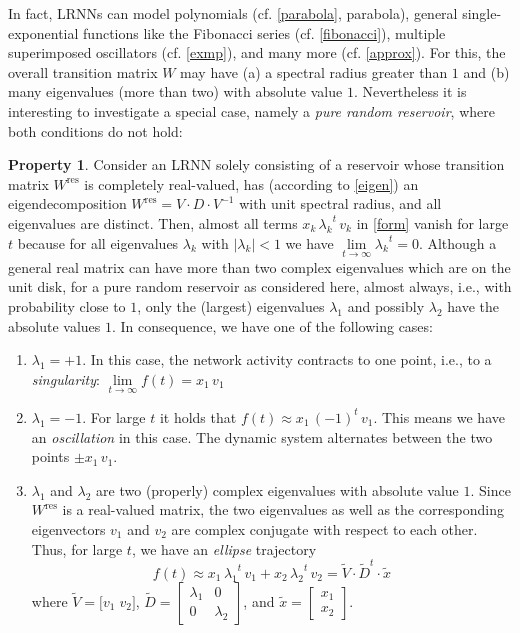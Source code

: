 \documentclass[twoside,11pt]{article}
\theoremstyle{definition}
\newtheorem{prop}{Property}
\begin{document}
In fact, LRNNs can model polynomials (cf. \cref{parabola}, parabola), general
single-exponential functions like the Fibonacci series (cf. \cref{fibonacci}),
multiple superimposed oscillators (cf. \cref{exmp}), and many more (cf.
\cref{approx}). For this, the overall transition matrix $W$ may have (a) a
spectral radius greater than $1$ and (b) many eigenvalues (more than two) with
absolute value $1$. Nevertheless it is interesting to investigate a special
case, namely a \emph{pure random reservoir}, where both conditions do not hold:

\begin{prop}\label{infty}
Consider an LRNN solely consisting of a reservoir whose transition matrix
$W^\mathrm{res}$ is completely real-valued, has (according to \cref{eigen}) an
eigendecomposition $W^\mathrm{res} = V \cdot D \cdot V^{-1}$ with unit spectral
radius, and all eigenvalues are distinct. Then, almost all terms
$x_k\,{\lambda_k}^t\,v_k$ in \cref{form} vanish for large $t$ because for all
eigenvalues $\lambda_k$ with $|\lambda_k| < 1$ we have $\lim\limits_{t \to
\infty} {\lambda_k}^t = 0$. Although a general real matrix can have more than
two complex eigenvalues which are on the unit disk, for a pure random reservoir
as considered here, almost always, i.e., with probability close to $1$, only the
(largest) eigenvalues $\lambda_1$ and possibly $\lambda_2$ have the absolute
values $1$. In consequence, we have one of the following cases:
\begin{enumerate}
  \item $\lambda_1 = +1$. In this case, the network activity contracts to one
	point, i.e., to a \emph{singularity}: $\lim\limits_{t \to \infty}
	f(t) = x_1\,v_1$
  \item $\lambda_1 = -1$. For large $t$ it holds that $f(t) \approx
	x_1\,(-1)^t\,v_1$. This means we have an \emph{oscillation} in this
	case. The dynamic system alternates between the two points $\pm x_1\,v_1$.
  \item $\lambda_1$ and $\lambda_2$ are two (properly) complex eigenvalues with
	absolute value $1$. Since $W^\mathrm{res}$ is a real-valued matrix, the two
	eigenvalues as well as the corresponding eigenvectors $v_1$ and $v_2$
	are complex conjugate with respect to each other. Thus, for large $t$, we
	have an \emph{ellipse} trajectory
	\[
		f(t) \approx x_1\,{\lambda_1}^t\,v_1 + x_2\,{\lambda_2}^t\,v_2
		= \tilde{V} \cdot \tilde{D}^t \cdot \tilde{x}
	\]
	where $\tilde{V} = \big[ v_1\;v_2 \big]$, $\tilde{D} = \left[
	\begin{array}{cc} \lambda_1 & 0 \\ 0 & \lambda_2 \end{array} \right]$,
	and $\tilde{x} = \left[ \begin{array}{c} x_1 \\ x_2 \end{array}
	\right]$.
\end{enumerate}
\end{prop}
\end{document}
